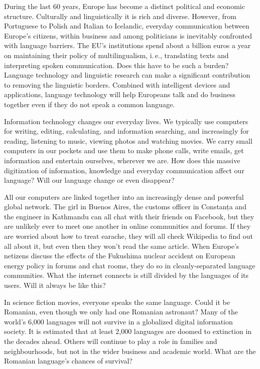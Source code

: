 \begin{multicols}{2}

During the last 60 years, Europe has become a distinct political and economic structure. Culturally and linguistically it is rich and diverse. However, from Portuguese to Polish and Italian to Icelandic, everyday communication between Europe’s citizens, within business and among politicians is inevitably confronted with language barriers. The EU's institutions spend about a billion euros a year on maintaining their policy of multilingualism, i.\,e., translating texts and interpreting spoken communication. Does this have to be such a burden? Language technology and linguistic research can make a significant contribution to removing the linguistic borders. Combined with intelligent devices and applications, language technology will help Europeans talk and do business together even if they do not speak a common language. 


Information technology changes our everyday lives. We typically use computers for writing, editing, calculating, and information searching, and increasingly for reading, listening to music, viewing photos and watching movies. We carry small computers in our pockets and use them to make phone calls, write emails, get information and entertain ourselves, wherever we are. How does this massive digitization of information, knowledge and everyday communication affect our language? Will our language change or even disappear? 

All our computers are linked together into an increasingly dense and powerful global network. The girl in Buenos Aires, the customs officer in Constanța and the engineer in Kathmandu can all chat with their friends on Facebook, but they are unlikely ever to meet one another in online communities and forums. If they are worried about how to treat earache, they will all check Wikipedia to find out all about it, but even then they won’t read the same article. When Europe's netizens discuss the effects of the Fukushima nuclear accident on European energy policy in forums and chat rooms, they do so in cleanly-separated language communities. What the internet connects is still divided by the languages of its users. Will it always be like this? 

In science fiction movies, everyone speaks the same language. Could it be Romanian, even though we only had one Romanian astronaut? Many of the world’s 6,000 languages will not survive in a globalized digital information society. It is estimated that at least 2,000 languages are doomed to extinction in the decades ahead. Others will continue to play a role in families and neighbourhoods, but not in the wider business and academic world. What are the Romanian language’s chances of survival? 


\end{multicols}
